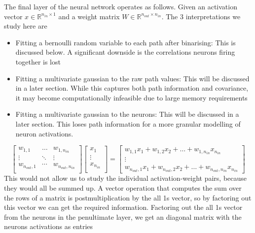 \documentclass{article}
\begin{document}
            The final layer of the neural network operates as follows. Given an activation vector $x \in \mathbb{R}^{n_{in} \times 1}$ and a weight matrix $W \in \mathbb{R}^{n_{out} \times n_{in}}$. The 3 interpretations we study here are
            \begin{itemize}
                \item 
                    Fitting a bernoulli random variable to each path after binarising: This is discussed below. A significant downside is the correlations neurons firing together is lost
                \item 
                    Fitting a multivariate gaussian to the raw path values: This will be discussed in a later section. While this captures both path information and covariance, it may become computationally infeasible due to large memory requirements
                \item 
                    Fitting a multivariate gaussian to the neurons: This will be discussed in a later section. This loses path information for a more granular modelling of neuron activations. 
            \end{itemize}
                \[
                    \begin{bmatrix}
                        w_{1,1} & \dots & w_{1,n_{in}} \\
                        \vdots & \ddots & \vdots \\
                        w_{n_{out}, 1} & \cdots & w_{n_{out}, n_{in}} \\
                    \end{bmatrix}
                    \begin{bmatrix}
                        x_1 \\
                        \vdots \\
                        x_{n_{in}} \\
                    \end{bmatrix}
                    = 
                    \begin{bmatrix}
                        w_{1,1}x_1 + w_{1, 2}x_2 + \dots + w_{1, n_{in}}x_{n_{in}} \\
                        \vdots \\
                        w_{n_{out},1}x_1 + w_{n_{out}, 2}x_2 + \dots + w_{n_{out}, n_{in}}x_{n_{in}}
                    \end{bmatrix}
                \]
                This would not allow us to study the individual activation-weight pairs, because they would all be summed up. A vector operation that computes the sum over the rows of a matrix is postmultiplication by the all 1s vector, so by factoring out this vector we can get the required information. Factoring out the all 1s vector from the neurons in the penultimate layer, we get an diagonal matrix with the neurons activations as entries 
\end{document}
